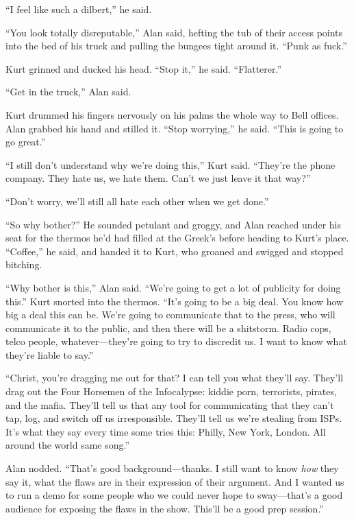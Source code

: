 ``I feel like such a dilbert,'' he said.

``You look totally disreputable,'' Alan said, hefting the tub of their
access points into the bed of his truck and pulling the bungees tight
around it.  ``Punk as fuck.''

Kurt grinned and ducked his head.  ``Stop it,'' he said. 
``Flatterer.''

``Get in the truck,'' Alan said.

Kurt drummed his fingers nervously on his palms the whole way to Bell
offices.  Alan grabbed his hand and stilled it.  ``Stop worrying,'' he
said.  ``This is going to go great.''

``I still don't understand why we're doing this,'' Kurt said. 
``They're the phone company.  They hate us, we hate them.  Can't we
just leave it that way?''

``Don't worry, we'll still all hate each other when we get done.''

``So why bother?'' He sounded petulant and groggy, and Alan reached
under his seat for the thermos he'd had filled at the Greek's before
heading to Kurt's place.  ``Coffee,'' he said, and handed it to Kurt,
who groaned and swigged and stopped bitching.

``Why bother is this,'' Alan said.  ``We're going to get a lot of
publicity for doing this.'' Kurt snorted into the thermos.  ``It's
going to be a big deal.  You know how big a deal this can be.  We're
going to communicate that to the press, who will communicate it to the
public, and then there will be a shitstorm.  Radio cops, telco people,
whatever---they're going to try to discredit us.  I want to know what
they're liable to say.''

``Christ, you're dragging me out for that?  I can tell you what
they'll say.  They'll drag out the Four Horsemen of the Infocalypse: 
kiddie porn, terrorists, pirates, and the mafia.  They'll tell us that
any tool for communicating that they can't tap, log, and switch off us
irresponsible.  They'll tell us we're stealing from ISPs.  It's what
they say every time some tries this:  Philly, New York, London.  All
around the world same song.''

Alan nodded.  ``That's good background---thanks.  I still want to know
\textit{how} they say it, what the flaws are in their expression of
their argument.  And I wanted us to run a demo for some people who we
could never hope to sway---that's a good audience for exposing the
flaws in the show.  This'll be a good prep session.''

